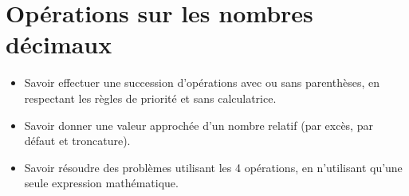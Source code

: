 \chapter{Opérations sur les nombres décimaux}\label{ChOpNombresDecimaux}

\vspace{5cm}
\begin{acquis}
\begin{itemize}
\item Savoir effectuer une succession d'opérations avec ou sans parenthèses, en respectant les règles de priorité et sans calculatrice.
\item Savoir donner une valeur approchée d'un nombre relatif (par excès, par défaut et troncature).
\columnbreak
\item Savoir résoudre des problèmes utilisant les 4 opérations, en n'utilisant qu'une seule expression mathématique.
\end{itemize}
\end{acquis}


%

\cours


\exercicesbase
\begin{colonne*exercice}

\end{colonne*exercice}


\exercicesappr
\begin{colonne*exercice}

\end{colonne*exercice}

\connaissances


\TravauxPratiques


\recreation %



